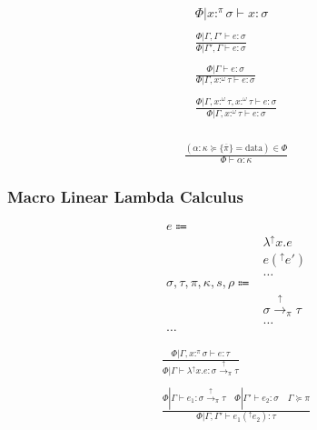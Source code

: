 \documentclass {article}
\begin{document}
\begin{gather*}
\Phi | x :^\pi \sigma \vdash x : \sigma \\
\\
\frac
{\Phi | \Gamma, \Gamma' \vdash e : \sigma}
{\Phi | \Gamma', \Gamma \vdash e : \sigma} \\
\\
\frac
{\Phi | \Gamma \vdash e : \sigma}
{\Phi | \Gamma, x :^\omega \tau \vdash e : \sigma } \\
\\
\frac
{\Phi | \Gamma, x :^\omega \tau, x :^\omega \tau \vdash e : \sigma}
{\Phi | \Gamma, x :^\omega \tau \vdash e : \sigma } \\
\end{gather*}

\begin{gather*}
\frac
{(\alpha : \kappa \succeq \{ \overline \pi \} = \text{data} ) \in \Phi}
{\Phi \vdash \alpha : \kappa}
\end{gather*}

\subsubsection{Macro Linear Lambda Calculus}
\begin{align*}
e \Coloneqq & \\
& \lambda^\uparrow x. e \tag{Macro Lambda}\\
& e(^\uparrow e') \tag{Macro Application}\\
& \dots \\
\sigma, \tau, \pi, \kappa, s, \rho \Coloneqq & \\
& \sigma \xrightarrow{\uparrow}_\pi \tau \tag{Macro} \\
& \dots \\
\dots
\end{align*}

\begin{gather*}
\frac
{\Phi | \Gamma, x :^\pi \sigma \vdash e : \tau}
{\Phi | \Gamma \vdash \lambda^\uparrow x. e : \sigma \xrightarrow{\uparrow}_\pi \tau } \\
\\
\frac
{\Phi | \Gamma \vdash e_1 : \sigma \xrightarrow{\uparrow}_\pi \tau \quad \Phi | \Gamma' \vdash e_2 : \sigma \quad \Gamma \succeq \pi}
{\Phi | \Gamma, \Gamma' \vdash e_1(^\uparrow e_2) : \tau}
\end{gather*}
\end{document}
